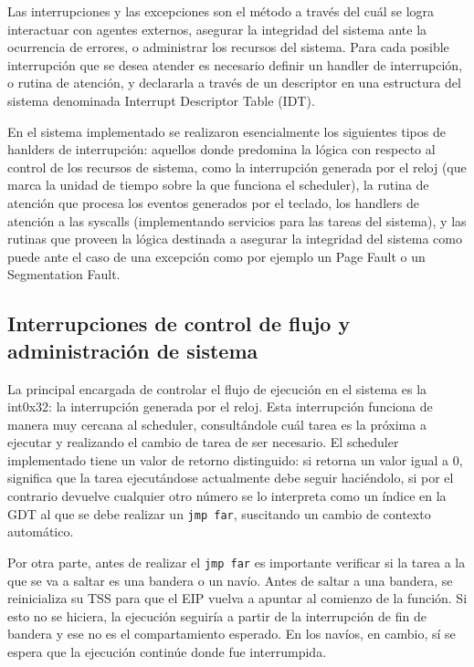 	Las interrupciones y las excepciones son el método a través del cuál 
se logra interactuar con agentes externos, asegurar la integridad del sistema 
ante la ocurrencia de errores, o administrar los recursos del sistema. Para cada 
posible interrupción que se desea atender es necesario definir un handler de 
interrupción, o rutina de atención, y declararla a través de un descriptor
en una estructura del sistema denominada Interrupt Descriptor Table (IDT).

	En el sistema implementado se realizaron esencialmente los siguientes tipos de 
hanlders de interrupción: aquellos donde predomina la lógica con respecto 
al control de los recursos de sistema, como la interrupción generada por el reloj 
(que marca la unidad de tiempo sobre la que funciona el scheduler), la rutina de atención 
que procesa los eventos generados por el teclado, los handlers de atención a las syscalls 
(implementando servicios para las tareas del sistema), y las rutinas que proveen la lógica 
destinada a asegurar la integridad del sistema como puede ante el caso de una excepción 
como por ejemplo un Page Fault o un Segmentation Fault.

\subsection{Interrupciones de control de flujo y administración de sistema}

	
	La principal encargada de controlar el flujo de ejecución en el sistema es la int0x32: 
la interrupción generada por el reloj. Esta interrupción funciona de manera muy cercana 
al scheduler, consultándole cuál tarea es la próxima a ejecutar y realizando el cambio 
de tarea de ser necesario. El scheduler implementado tiene un valor de retorno distinguido: 
si retorna un valor igual a 0, significa que la tarea ejecutándose actualmente debe seguir haciéndolo, 
si por el contrario devuelve cualquier otro número se lo interpreta como un índice en
la GDT al que se debe realizar un \texttt{jmp far}, suscitando un cambio de contexto 
automático.

	Por otra parte, antes de realizar el \texttt{jmp far} es importante
verificar si la tarea a la que se va a saltar es una bandera o un
navío. Antes de saltar a una bandera, se reinicializa su TSS para
que el EIP vuelva a apuntar al comienzo de la función. Si esto no se hiciera, 
la ejecución seguiría a partir de la interrupción de fin de bandera
y ese no es el compartamiento esperado. En los navíos, en cambio, sí se espera
que la ejecución continúe donde fue interrumpida.


